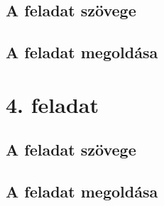 \documentclass[12pt]{article}
\begin{document}
\subsection*{ A feladat szövege}
 
 \subsection*{A feladat megoldása}

\newpage
\section*{4. feladat}
\subsection*{ A feladat szövege}
 
 \subsection*{A feladat megoldása}
\end{document}
